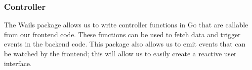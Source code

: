\subsubsection*{Controller}

The Wails package allows us to write controller functions in Go that are callable from our frontend code. These functions can be used to fetch data and trigger events in the backend code. This package also allows us to emit events that can be watched by the frontend; this will allow us to easily create a reactive user interface.